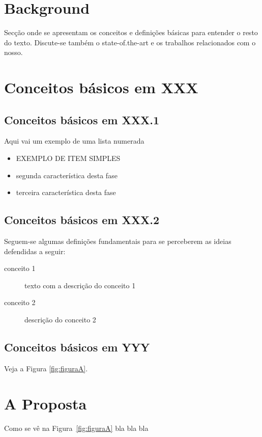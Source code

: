 \documentclass{article}%
\begin{document}
\section{Background} \label{sec:background}
Secção onde se apresentam os conceitos e definições básicas para entender o resto do texto.
Discute-se também o state-of.the-art e os trabalhos relacionados com o nosso.

\section{Conceitos básicos em XXX} \label{sec:concbasicos}
\subsection{Conceitos básicos em XXX.1} %
Aqui vai um exemplo de uma lista numerada
\begin{itemize}  %
\item EXEMPLO DE ITEM SIMPLES
\item segunda característica desta fase
\item terceira característica desta fase
\end{itemize}

\subsection{Conceitos básicos em XXX.2}
Seguem-se algumas definições fundamentais para se perceberem as ideias
defendidas a seguir:
\begin{description} %
\item[conceito 1] texto com a descrição do  conceito 1
\item[conceito 2] descrição do  conceito 2
\end{description}

\subsection{Conceitos básicos em YYY}
Veja a Figura \ref{fig:figuraA}. %

\section{A Proposta} \label{sec:proposta}
Como se vê na Figura~\ref{fig:figuraA} bla bla bla
\end{document}

